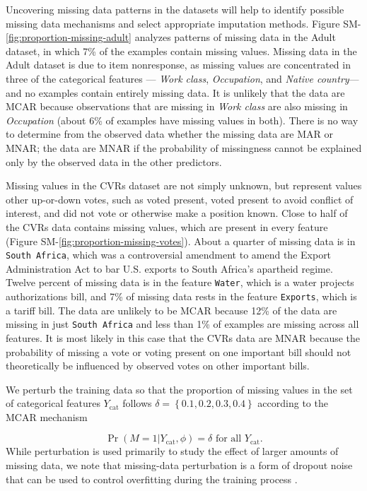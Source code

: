 \documentclass[10pt]{book}
\theoremstyle{definition}
\begin{document}
Uncovering missing data patterns in the datasets will help to identify possible missing data mechanisms and select appropriate imputation methods. Figure SM-\ref{fig:proportion-missing-adult} analyzes patterns of missing data in the Adult dataset, in which 7\% of the examples contain missing values. Missing data in the Adult dataset is due to item nonresponse, as missing values are concentrated in three of the categorical features --- \emph{Work class}, \emph{Occupation}, and \emph{Native country}--- and no examples contain entirely missing data. It is unlikely that the data are MCAR because observations that are missing in \emph{Work class} are also missing in \emph{Occupation} (about 6\% of examples have missing values in both). There is no way to determine from the observed data whether the missing data are MAR or MNAR; the data are MNAR if the probability of missingness cannot be explained only by the observed data in the other predictors.

Missing values in the CVRs dataset are not simply unknown, but represent values other up-or-down votes, such as voted present, voted present to avoid conflict of interest, and did not vote or otherwise make a position known. Close to half of the CVRs data contains missing values, which are present in every feature (Figure SM-\ref{fig:proportion-missing-votes}). About a quarter of missing data is in \texttt{South Africa}, which was a controversial amendment to amend the Export Administration Act to bar U.S. exports to South Africa's apartheid regime. Twelve percent of missing data is in the feature \texttt{Water}, which is a water projects authorizations bill, and 7\% of missing data rests in the feature \texttt{Exports}, which is a tariff bill. The data are unlikely to be MCAR because 12\% of the data are missing in just \texttt{South Africa} and less than 1\% of examples are missing across all features. It is most likely in this case that the CVRs data are MNAR because the probability of missing a vote or voting present on one important bill should not theoretically be influenced by observed votes on other important bills. 

\par
{}

We perturb the training data so that the proportion of missing values in the set of categorical features $Y_{\mathrm{cat}}$ follows $\delta = \left\{0.1, 0.2, 0.3, 0.4\right\}$ according to the MCAR mechanism
 
 \begin{equation}\label{3.1}
\Pr (M = 1 | Y_{\mathrm{cat}}, \phi) = \delta \text{ for all } Y_{\mathrm{cat}}.
\end{equation} While perturbation is used primarily to study the effect of larger amounts of missing data, we note that missing-data perturbation is a form of dropout noise that can be used to control overfitting during the training process \citep{wager2013}.
\end{document}
